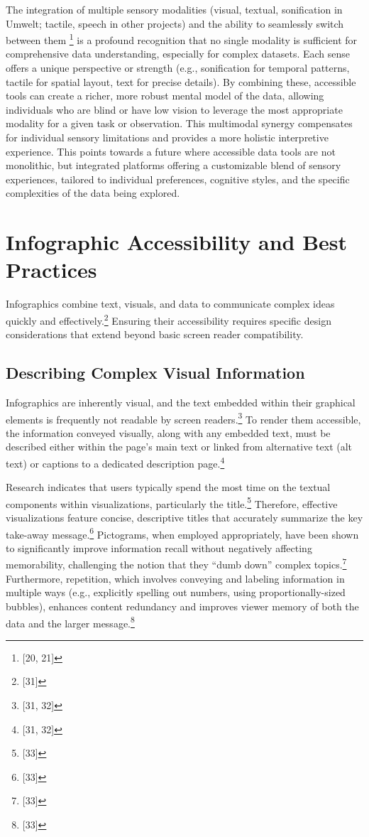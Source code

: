 The integration of multiple sensory modalities (visual, textual, sonification in Umwelt; tactile, speech in other projects) and the ability to seamlessly switch between them \footnote{[20, 21]} is a profound recognition that no single modality is sufficient for comprehensive data understanding, especially for complex datasets. Each sense offers a unique perspective or strength (e.g., sonification for temporal patterns, tactile for spatial layout, text for precise details). By combining these, accessible tools can create a richer, more robust mental model of the data, allowing individuals who are blind or have low vision to leverage the most appropriate modality for a given task or observation. This multimodal synergy compensates for individual sensory limitations and provides a more holistic interpretive experience. This points towards a future where accessible data tools are not monolithic, but integrated platforms offering a customizable blend of sensory experiences, tailored to individual preferences, cognitive styles, and the specific complexities of the data being explored.

\section{Infographic Accessibility and Best Practices}
Infographics combine text, visuals, and data to communicate complex ideas quickly and effectively.\footnote{[31]} Ensuring their accessibility requires specific design considerations that extend beyond basic screen reader compatibility.

\subsection{Describing Complex Visual Information}
Infographics are inherently visual, and the text embedded within their graphical elements is frequently not readable by screen readers.\footnote{[31, 32]} To render them accessible, the information conveyed visually, along with any embedded text, must be described either within the page's main text or linked from alternative text (alt text) or captions to a dedicated description page.\footnote{[31, 32]}

Research indicates that users typically spend the most time on the textual components within visualizations, particularly the title.\footnote{[33]} Therefore, effective visualizations feature concise, descriptive titles that accurately summarize the key take-away message.\footnote{[33]} Pictograms, when employed appropriately, have been shown to significantly improve information recall without negatively affecting memorability, challenging the notion that they ``dumb down'' complex topics.\footnote{[33]} Furthermore, repetition, which involves conveying and labeling information in multiple ways (e.g., explicitly spelling out numbers, using proportionally-sized bubbles), enhances content redundancy and improves viewer memory of both the data and the larger message.\footnote{[33]}

